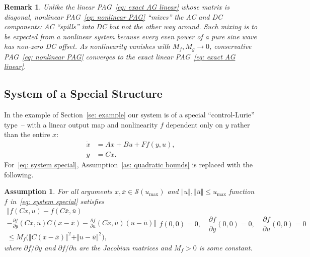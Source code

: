 \documentclass[letterpaper, 10 pt, conference]{ieeeconf}
\newcommand{\mmax}{_\mathrm{max}}
\newcommand{\pb}[1]{\big( #1 \big)}
\newcommand{\norm}[1]{\Vert #1 \Vert}
\newcommand{\normB}[1]{\Big\Vert #1 \Big\Vert}
\newcommand{\pd}[2][]{\frac{\partial #1}{\partial #2}}
\newcommand{\calS}{\mathcal{S}}
\newtheorem{remark}{Remark}
\newtheorem{assumption}{Assumption}
\begin{document}
\begin{remark}
    Unlike the linear PAG~\eqref{eq: exact AG linear} whose matrix is diagonal, nonlinear PAG~\eqref{eq: nonlinear PAG} ``mixes'' the AC and DC components: AC ``spills'' into DC but not the other way around. Such mixing is to be expected from a nonlinear system because every even power of a pure sine wave has non-zero DC offset. As nonlinearity vanishes with $M_f, M_g \to 0$, conservative PAG~\eqref{eq: nonlinear PAG} converges to the exact linear PAG~\eqref{eq: exact AG linear}.
\end{remark}

\subsection{System of a Special Structure}

In the example of Section~\ref{se: example} our system is of a special ``control-Lurie'' type~-- with a linear output map and nonlinearity $f$ dependent only on $y$ rather than the entire $x$:
\begin{subequations}
    \label{eq: system special}
    \begin{align}
        \dot x &= Ax + Bu + F f(y,u), \\
        y &= Cx.
    \end{align}
\end{subequations}
For~\eqref{eq: system special}, Assumption~\ref{as: quadratic bounds} is replaced with the following.

\begin{assumption}
    \label{as: quadratic bounds special}
    For all arguments $x, \bar x \in \calS(u\mmax)$ and $\norm{u}, \norm{\bar u} \leq u\mmax$ function $f$ in~\eqref{eq: system special} satisfies
    \begin{subequations}
        \begin{multline}
            \label{eq: f quadratic bound special}
            \normB{f(Cx, u) - f(C \bar x, \bar u) \\
            - \pd[f]{y}(C \bar x, \bar u) C (x - \bar x)
            - \pd[f]{u}(C \bar x, \bar u) (u - \bar u)} \\
            \leq M_f \pb{\norm{C(x - \bar x)}^2 + \norm{u - \bar u}^2},
        \end{multline}
        \begin{equation}
            f(0,0) = 0, \quad \pd[f]{y}(0,0) = 0, \quad \pd[f]{u}(0,0) = 0
        \end{equation}
    \end{subequations}
    where $\partial f/\partial y$ and $\partial f/\partial u$ are the Jacobian matrices and $M_f > 0$ is some constant.
\end{assumption}
\end{document}
